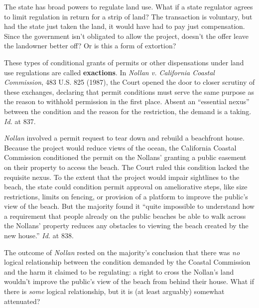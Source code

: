 The state has broad powers to regulate land use. What if a state regulator
agrees to limit regulation in return for a strip of land? The transaction is
voluntary, but had the state just taken the land, it would have had to pay just
compensation. Since the government isn't obligated to allow the project, doesn't
the offer leave the landowner better off? Or is this a form of extortion? 

These types of conditional grants of permits or other dispensations under land
use regulations are called \textbf{exactions}. In \textit{Nollan v. California
Coastal Commission}, 483 U.S. 825 (1987), the Court opened the door to closer
scrutiny of these exchanges, declaring that permit conditions must serve the
same purpose as the reason to withhold permission in the first place. Absent an
``essential nexus'' between the condition and the reason for the restriction,
the demand is a taking. \textit{Id.} at 837. 

\textit{Nollan} involved a permit request to tear down and rebuild a beachfront
house. Because the project would reduce views of the ocean, the California
Coastal Commission conditioned the permit on the Nollans' granting a public
easement on their property to access the beach. The Court ruled this condition
lacked the requisite nexus. To the extent that the project would impair
sightlines to the beach, the state could condition permit approval on
ameliorative steps, like size restrictions, limits on fencing, or provision of a
platform to improve the public's view of the beach. But the majority found it
``quite impossible to understand how a requirement that people already on the
public beaches be able to walk across the Nollans' property reduces any
obstacles to viewing the beach created by the new house.'' \textit{Id.} at 838.

The outcome of \textit{Nollan} rested on the majority's conclusion that there
was \textit{no} logical relationship between the condition demanded by the
Coastal Commission and the harm it claimed to be regulating: a right to cross
the Nollan's land wouldn't improve the public's view of the beach from behind
their house. What if there is \textit{some} logical relationship, but it is (at
least arguably) somewhat attenuated?

